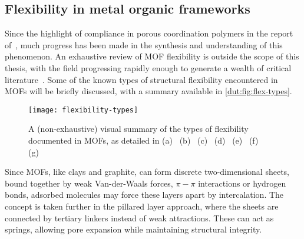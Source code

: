 \subsection{Flexibility in metal organic frameworks}

Since the highlight of compliance in porous coordination polymers 
in the report of~\citet{kitagawaFunctionalPorousCoordination2004},
much progress has been made in the synthesis and understanding
of this phenomenon. An exhaustive review of \gls{MOF} flexibility is 
outside the scope of this thesis, with the field progressing 
rapidly enough to generate a wealth of critical
literature~\cite{schneemannFlexibleMetalOrganic2014, %
fereyHybridPorousSolids2008, liMetalOrganicFrameworks2012, %
haldarInterpenetrationCoordinationPolymers2015, %
stassenUpdatedRoadmapIntegration2017, %
vanduyfhuysThermodynamicInsightStimuliresponsive2018, %
murdockApproachesSynthesizingBreathing2014}.
Some of the known types of structural flexibility encountered in \glspl{MOF}
will be briefly discussed, with a summary available in 
\autoref{dut:fig:flex-types}. 

\begin{figure}[htb]
    \centering
    
    \texttt{[image: flexibility-types]}%
    \caption{A (non-exhaustive) visual summary of the types of
    flexibility documented in \glspl{MOF}, as detailed in 
    (a)~\citet{liHydrogenBondregulatedMicroporous2001}
    (b)~\citet{kitauraPorousCoordinationPolymerCrystals2003}
    (c)~\citet{kitauraPillaredLayerCoordinationPolymer2002}
    (d)~\citet{kepertVersatileFamilyInterconvertible2000,%
    kitauraPorousCoordinationPolymerCrystals2003}
    (e)~\citet{nelsonSupercriticalProcessingRoute2009}
    (f)~\citet{fairen-jimenezOpeningGateFramework2011}
    (g)~\citet{bourrellyDifferentAdsorptionBehaviors2005, %
    serreExplanationVeryLarge2007}}%
    \label{dut:fig:flex-types}
    
\end{figure}

Since \glspl{MOF}, like clays and graphite, can form discrete 
two-dimensional sheets, bound together by weak Van-der-Waals forces,
\( \pi-\pi \) interactions or hydrogen bonds,
adsorbed molecules may force these layers apart by 
intercalation. The concept is taken further in the 
pillared layer approach, where the sheets are connected 
by tertiary linkers instead of weak attractions. These can act 
as springs, allowing pore expansion while maintaining
structural integrity.

